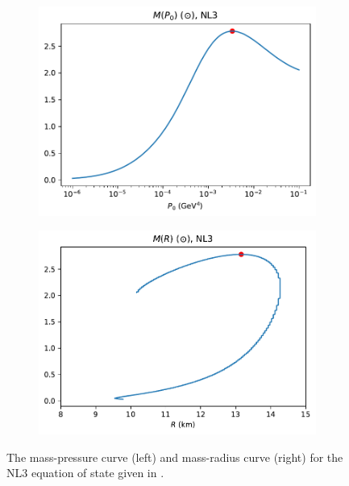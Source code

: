 \begin{figure}[h!]
    \centering
    \begin{subfigure}{.5\textwidth}
        \includegraphics[width=\textwidth]{images/adv/p0_analysis,NL3.pdf}
    \end{subfigure}%
    \begin{subfigure}{.5\textwidth}
        \includegraphics[width=\textwidth]{images/adv/r_analysis,NL3.pdf}
    \end{subfigure}
    \caption{The mass-pressure curve (left) and mass-radius curve (right) for the NL3 equation of state given in \autocite{diener_2008}.}
    \label{fig: nl3 mass radius pressure}
\end{figure}

